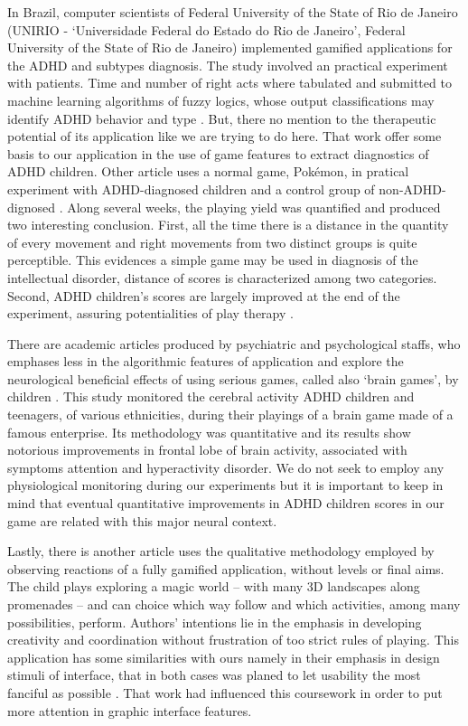 In Brazil, computer scientists of Federal University of the State of Rio de Janeiro (UNIRIO - `Universidade Federal do Estado do Rio de Janeiro', Federal University of the State of Rio de Janeiro) implemented gamified applications for the ADHD and subtypes diagnosis. The study involved an practical experiment with patients. Time and number of right acts where tabulated and submitted to machine learning algorithms of fuzzy logics, whose output classifications may identify ADHD behavior  and type \citep{brasileiros}. But, there no mention to the therapeutic potential of its application like we are trying to do here. That work offer some basis to our application in the use of game features to extract diagnostics of ADHD children. Other article uses a normal game, Pok\'{e}mon, in pratical experiment with ADHD-diagnosed children and a control group of non-ADHD-dignosed \citep{ADHDGames}. Along several weeks, the playing yield was quantified and produced two interesting conclusion. First, all the time there is a distance in the quantity of every movement and right movements from two distinct groups is quite perceptible. This evidences a simple game may be used in diagnosis of the intellectual disorder, distance of scores is characterized among two categories. Second, ADHD children's scores are largely improved at the end of the experiment, assuring potentialities of play therapy \citep{ADHDGames}.

There are academic articles produced by psychiatric and psychological staffs, who emphases less in the algorithmic features of application and explore the neurological beneficial effects of using serious games, called also `brain games', by children \citep{brainGames}. This study monitored the cerebral activity ADHD children and teenagers, of various ethnicities, during their playings of a brain game made of a famous enterprise. Its methodology was quantitative and its results show notorious improvements in frontal lobe of brain activity, associated with symptoms attention and hyperactivity disorder. We do not seek to employ any physiological monitoring during our experiments but it is important to keep in mind that eventual quantitative improvements in ADHD children scores in our game are related with this major neural context. 

Lastly, there is another article \citep{design} uses the qualitative methodology employed by observing reactions of a fully gamified application, without levels or final aims. The child plays exploring a magic world -- with many 3D landscapes along promenades -- and can choice which way follow and which activities, among many possibilities, perform. Authors' intentions lie in the emphasis in developing creativity and coordination without frustration of too strict rules of playing. This application has some similarities with ours namely in their emphasis in design stimuli of interface, that in both cases was planed to let usability the most fanciful as possible \citep{design}. That work had influenced this coursework in order to put more attention in graphic interface features.


